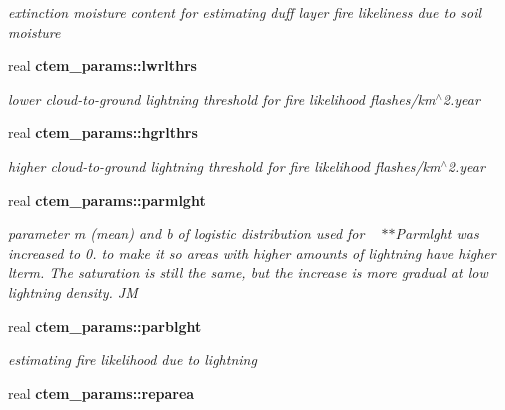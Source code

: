 \begin{DoxyCompactItemize}
\begin{DoxyCompactList}\small\item\em extinction moisture content for estimating duff layer fire likeliness due to soil moisture \end{DoxyCompactList}\item 
\hypertarget{namespacectem__params_a4e6ad236fa1a30bbc7841a03cce0fb37}{}real {\bfseries ctem\+\_\+params\+::lwrlthrs}\label{namespacectem__params_a4e6ad236fa1a30bbc7841a03cce0fb37}

\begin{DoxyCompactList}\small\item\em lower cloud-\/to-\/ground lightning threshold for fire likelihood flashes/km$^\wedge$2.year \end{DoxyCompactList}\item 
\hypertarget{namespacectem__params_a2ec617391422478c2c13c4215060b759}{}real {\bfseries ctem\+\_\+params\+::hgrlthrs}\label{namespacectem__params_a2ec617391422478c2c13c4215060b759}

\begin{DoxyCompactList}\small\item\em higher cloud-\/to-\/ground lightning threshold for fire likelihood flashes/km$^\wedge$2.year \end{DoxyCompactList}\item 
\hypertarget{namespacectem__params_a689825245070f06cb1156044940af148}{}real {\bfseries ctem\+\_\+params\+::parmlght}\label{namespacectem__params_a689825245070f06cb1156044940af148}

\begin{DoxyCompactList}\small\item\em parameter m (mean) and b of logistic distribution used for ~\newline
$\ast$$\ast$\+Parmlght was increased to 0. to make it so areas with higher amounts of lightning have higher lterm. The saturation is still the same, but the increase is more gradual at low lightning density. J\+M \end{DoxyCompactList}\item 
\hypertarget{namespacectem__params_a1b407a06b92feb424b8338ff8c19e966}{}real {\bfseries ctem\+\_\+params\+::parblght}\label{namespacectem__params_a1b407a06b92feb424b8338ff8c19e966}

\begin{DoxyCompactList}\small\item\em estimating fire likelihood due to lightning \end{DoxyCompactList}\item 
\hypertarget{namespacectem__params_a7f4c73f924960839ad06590397b9855b}{}real {\bfseries ctem\+\_\+params\+::reparea}\label{namespacectem__params_a7f4c73f924960839ad06590397b9855b}


\end{DoxyCompactItemize}
